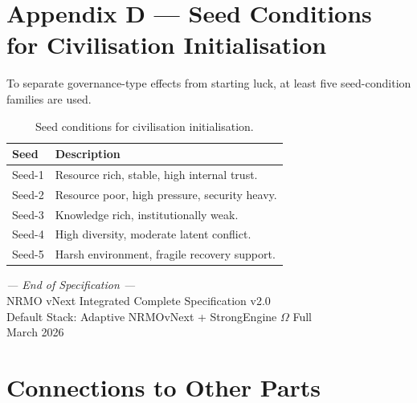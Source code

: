 \section{Appendix D --- Seed Conditions for Civilisation
Initialisation}
\label{sec:omega-seed-conditions}

To separate governance-type effects from starting luck, at least
five seed-condition families are used.

\begin{table}[ht]
\centering
\small
\begin{tabularx}{\linewidth}{lX}
\toprule
\textbf{Seed} & \textbf{Description} \\
\midrule
Seed-1 & Resource rich, stable, high internal trust. \\
Seed-2 & Resource poor, high pressure, security heavy. \\
Seed-3 & Knowledge rich, institutionally weak. \\
Seed-4 & High diversity, moderate latent conflict. \\
Seed-5 & Harsh environment, fragile recovery support. \\
\bottomrule
\end{tabularx}
\caption[Seed conditions]{Seed conditions for civilisation
initialisation.}
\label{tab:omega-seed-conditions}
\end{table}

\medskip

\centering
\textit{--- End of Specification ---}\\
NRMO vNext Integrated Complete Specification v2.0\\
Default Stack: Adaptive NRMOvNext + StrongEngine $\Omega$ Full\\
March 2026

\section*{Connections to Other Parts}

